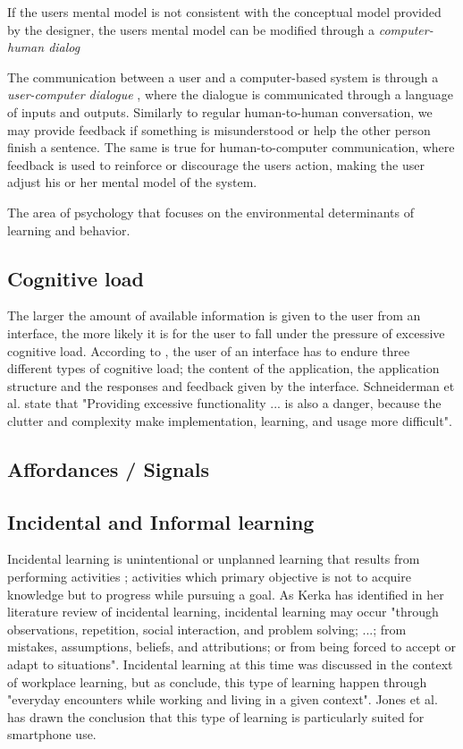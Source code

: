 If the users mental model is not consistent with the conceptual model provided by the designer, the users mental model can be modified through a \textit{computer-human dialog}

The communication between a user and a computer-based system is through a \textit{user-computer dialogue} \cite{Foley1996}, where the dialogue is communicated through a language of inputs and outputs. Similarly to regular human-to-human conversation, we may provide feedback if something is misunderstood or help the other person finish a sentence. The same is true for human-to-computer communication, where feedback is used to reinforce or discourage the users action, making the user adjust his or her mental model of the system.

The area of psychology that focuses on the environmental determinants of learning and behavior.

\subsection{Cognitive load}
The larger the amount of available information is given to the user from an interface, the more likely it is for the user to fall under the pressure of excessive cognitive load. According to \cite{Jih1992}, the user of an interface has to endure three different types of cognitive load; the content of the application, the application structure and the responses and feedback given by the interface. Schneiderman et al. state that "Providing excessive functionality ... is also a danger, because the clutter and complexity make implementation, learning, and usage more difficult".

\subsection{Affordances / Signals}

\subsection{Incidental and Informal learning}
Incidental learning is unintentional or unplanned learning that results from performing activities \cite{Kerka2000}; activities which primary objective is not to acquire knowledge but to progress while pursuing a goal. As Kerka \cite{Kerka2000} has identified in her literature review of incidental learning, incidental learning may occur "through observations, repetition, social interaction, and problem solving; ...; from mistakes, assumptions, beliefs, and attributions; or from being forced to accept or adapt to situations". Incidental learning at this time was discussed in the context of workplace learning, but as \cite{Marsick2001} conclude, this type of learning happen through "everyday encounters while working and living in a given context". Jones et al. \cite{Jones2014} has drawn the conclusion that this type of learning is particularly suited for smartphone use.

